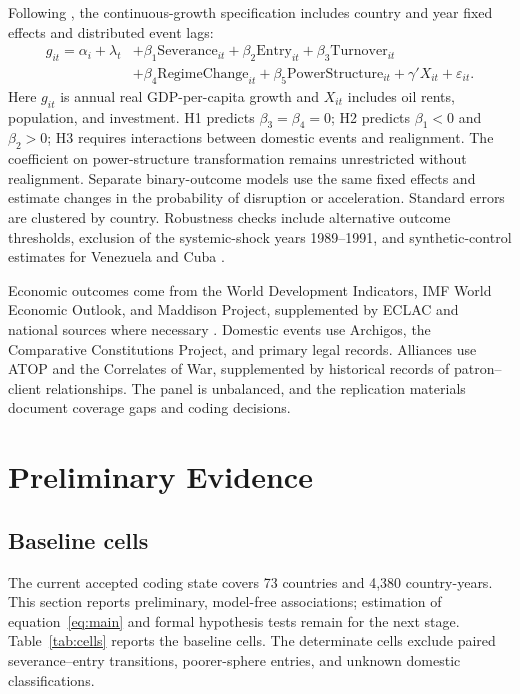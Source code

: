 \documentclass[11pt]{article}
\begin{document}
Following \textcite{acemoglu_naidu_restrepo_robinson_2019}, the continuous-growth specification includes country and year fixed effects and distributed event lags:
\begin{equation}
\begin{split}
g_{it} = \alpha_i + \lambda_t &+ \beta_1 \mathrm{Severance}_{it} + \beta_2 \mathrm{Entry}_{it} + \beta_3 \mathrm{Turnover}_{it} \\
&+ \beta_4 \mathrm{RegimeChange}_{it} + \beta_5 \mathrm{PowerStructure}_{it} + \gamma' X_{it} + \varepsilon_{it}.
\end{split}
\label{eq:main}
\end{equation}
Here $g_{it}$ is annual real GDP-per-capita growth and $X_{it}$ includes oil rents, population, and investment. H1 predicts $\beta_3=\beta_4=0$; H2 predicts $\beta_1<0$ and $\beta_2>0$; H3 requires interactions between domestic events and realignment. The coefficient on power-structure transformation remains unrestricted without realignment. Separate binary-outcome models use the same fixed effects and estimate changes in the probability of disruption or acceleration. Standard errors are clustered by country. Robustness checks include alternative outcome thresholds, exclusion of the systemic-shock years 1989--1991, and synthetic-control estimates for Venezuela and Cuba \parencite{abadie_diamond_hainmueller_2010}.

Economic outcomes come from the World Development Indicators, IMF World Economic Outlook, and Maddison Project, supplemented by ECLAC and national sources where necessary \parencite{worldbank_wdi,imf_weo,bolt_vanzanden_2024,eclac_cepalstat}. Domestic events use Archigos, the Comparative Constitutions Project, and primary legal records. Alliances use ATOP and the Correlates of War, supplemented by historical records of patron--client relationships. The panel is unbalanced, and the replication materials document coverage gaps and coding decisions.

\section{Preliminary Evidence}
\label{sec:evidence}

\subsection{Baseline cells}

The current accepted coding state covers 73 countries and 4,380 country-years. This section reports preliminary, model-free associations; estimation of equation~\eqref{eq:main} and formal hypothesis tests remain for the next stage. Table~\ref{tab:cells} reports the baseline cells. The determinate cells exclude paired severance--entry transitions, poorer-sphere entries, and unknown domestic classifications.
\end{document}

